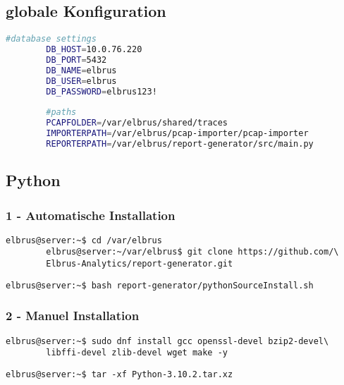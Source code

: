 \documentclass{article}
\begin{document}
	\newpage
	\subsection{globale Konfiguration}
	\lstset{style=files}
	\begin{lstlisting}[caption={Anhand von '.config.example' eigene '.config' Datei in \newline'/var/elbrus/shared' anlegen.}, language=bash]
		#database settings
		DB_HOST=10.0.76.220
		DB_PORT=5432
		DB_NAME=elbrus
		DB_USER=elbrus
		DB_PASSWORD=elbrus123!
		
		#paths
		PCAPFOLDER=/var/elbrus/shared/traces
		IMPORTERPATH=/var/elbrus/pcap-importer/pcap-importer
		REPORTERPATH=/var/elbrus/report-generator/src/main.py
	\end{lstlisting}

	\newpage
	\subsection{Python}
	\lstset{style=commands}
	\subsubsection{1 - Automatische Installation}
	\begin{lstlisting}[caption={Kopieren des Github Repositorys 'report-generator'.}]
		elbrus@server:~$ cd /var/elbrus
		elbrus@server:~/var/elbrus$ git clone https://github.com/\
		Elbrus-Analytics/report-generator.git
	\end{lstlisting}

	\begin{lstlisting}[caption={Ausführen des 'pythonSourceInstall.sh' Scripts.}]
		elbrus@server:~$ bash report-generator/pythonSourceInstall.sh
	\end{lstlisting}
	
	\subsubsection{2 - Manuel Installation}
	\begin{lstlisting}[caption={Installieren von benötigten Packeten und Abhängigkeiten.}]
		elbrus@server:~$ sudo dnf install gcc openssl-devel bzip2-devel\
		libffi-devel zlib-devel wget make -y
	\end{lstlisting}
	
	\begin{lstlisting}[caption={Extrahieren der installierent Dateien.}]
		elbrus@server:~$ tar -xf Python-3.10.2.tar.xz
	\end{lstlisting}
	
\end{document}
